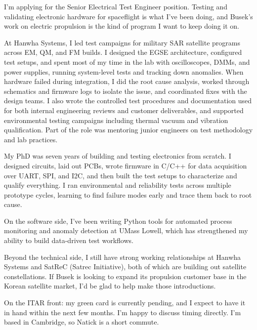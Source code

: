 \documentclass[letterpaper,11pt]{moderncv}
\date{\today}
\begin{document}
\makelettertitle

I'm applying for the Senior Electrical Test Engineer position. Testing and validating electronic hardware for spaceflight is what I've been doing, and Busek's work on electric propulsion is the kind of program I want to keep doing it on.

At Hanwha Systems, I led test campaigns for military SAR satellite programs across EM, QM, and FM builds. I designed the EGSE architecture, configured test setups, and spent most of my time in the lab with oscilloscopes, DMMs, and power supplies, running system-level tests and tracking down anomalies. When hardware failed during integration, I did the root cause analysis, worked through schematics and firmware logs to isolate the issue, and coordinated fixes with the design teams. I also wrote the controlled test procedures and documentation used for both internal engineering reviews and customer deliverables, and supported environmental testing campaigns including thermal vacuum and vibration qualification. Part of the role was mentoring junior engineers on test methodology and lab practices.

My PhD was seven years of building and testing electronics from scratch. I designed circuits, laid out PCBs, wrote firmware in C/C++ for data acquisition over UART, SPI, and I2C, and then built the test setups to characterize and qualify everything. I ran environmental and reliability tests across multiple prototype cycles, learning to find failure modes early and trace them back to root cause.

On the software side, I've been writing Python tools for automated process monitoring and anomaly detection at UMass Lowell, which has strengthened my ability to build data-driven test workflows.

Beyond the technical side, I still have strong working relationships at Hanwha Systems and SatReC (Satrec Initiative), both of which are building out satellite constellations. If Busek is looking to expand its propulsion customer base in the Korean satellite market, I'd be glad to help make those introductions.

On the ITAR front: my green card is currently pending, and I expect to have it in hand within the next few months. I'm happy to discuss timing directly. I'm based in Cambridge, so Natick is a short commute.

\makeletterclosing
\end{document}

